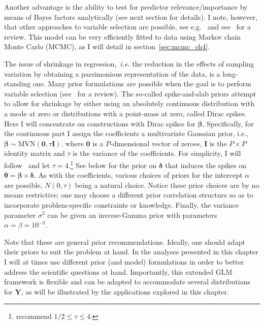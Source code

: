 Another advantage is the ability to test for predictor relevance/importance by means of Bayes factors analytically (see next section for details).
I note, however, that other approaches to variable selection are possible, see e.g.~\cite{Mitchell1988,George1993} and see~\cite{OHara2009} for a review.
This model can be very efficiently fitted to data using Markov chain Monte Carlo (MCMC), as I will detail in section~\ref{sec:mcmc_ch4}.

The issue of shrinkage in regression,~\textit{i.e.} the reduction in the effects of sampling variation by obtaining a parsimonious representation of the data, is a long-standing one.
Many prior formulations are possible when the goal is to perform variable selection (see~\cite{Malsiner2016} for a review).
The so-called spike-and-slab priors attempt to allow for shrinkage by either using an absolutely continuous distribution with a mode at zero or distributions with a point-mass at zero, called Dirac spikes.
Here I will concentrate on constructions with Dirac spikes for $\boldsymbol\beta$.
Specifically, for the continuous part I  assign the coefficients a multivariate Gaussian prior, i.e., $\boldsymbol\beta \sim \text{MVN}(\boldsymbol 0, \tau \boldsymbol I)$.
where $\boldsymbol 0$ is a $P$-dimensional vector of zeroes, $\boldsymbol I$ is the $P \times P$ identity matrix and $\tau$ is the variance of the coefficients.
For simplicity, I will follow~\cite{Lemey2014} and let $\tau = 4$.\footnote{\cite{Kuo1998} recommend $1/2 \leq \tau \leq 4$.}
See below for the prior on $\boldsymbol\delta$ that induces the spikes on $\boldsymbol\theta = \boldsymbol\beta \times \boldsymbol\delta$.
As with the coefficients, various choices of priors for the intercept $\alpha$ are possible,  $N(0, \tau)$ being a natural choice.
Notice these prior choices are by no means restrictive; one may choose a different prior correlation structure so as to incorporate problem-specific constraints or knowledge.
Finally, the variance parameter $\sigma^2$  can be given an inverse-Gamma prior with parameters $\alpha = \beta = 10^{-3}$.

Note that these are general prior recommendations.
Ideally, one should adapt their priors to suit the problem at hand.
In the analyses presented in this chapter I will at times use different prior (and model) formulations in order to better address the scientific questions at hand. 
Importantly, this extended GLM framework is flexible and can be adapted to accommodate several distributions for $\boldsymbol Y$, as will be illustrated by the applications explored in this chapter.

